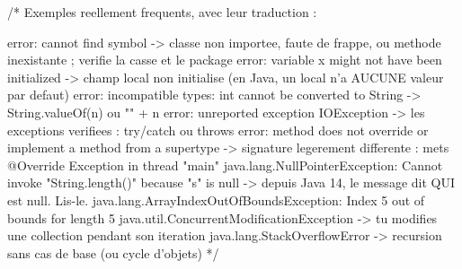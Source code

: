 \begin{codejava}
/*
  Exemples reellement frequents, avec leur traduction :

  error: cannot find symbol                -> classe non importee, faute de frappe, ou methode
                                             inexistante ; verifie la casse et le package
  error: variable x might not have been initialized -> champ local non initialise (en Java, un
                                             local n'a AUCUNE valeur par defaut)
  error: incompatible types: int cannot be converted to String -> String.valueOf(n) ou "" + n
  error: unreported exception IOException  -> les exceptions verifiees : try/catch ou throws
  error: method does not override or implement a method from a supertype
                                          -> signature legerement differente : mets @Override
  Exception in thread "main" java.lang.NullPointerException: Cannot invoke "String.length()"
       because "s" is null                 -> depuis Java 14, le message dit QUI est null. Lis-le.
  java.lang.ArrayIndexOutOfBoundsException: Index 5 out of bounds for length 5
  java.util.ConcurrentModificationException -> tu modifies une collection pendant son iteration
  java.lang.StackOverflowError              -> recursion sans cas de base (ou cycle d'objets)
*/
\end{codejava}

